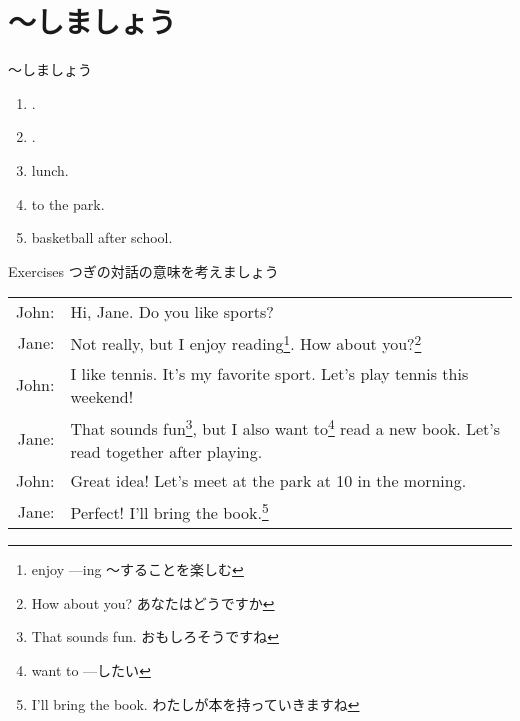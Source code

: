 \documentclass[aspectratio=169,xcolor={dvipsnames,table}]{beamer}
\begin{document}
\section{～しましょう}
\begin{frame}[plain]{～しましょう}
 \begin{enumerate}
  \item<1->  .
  \item<2->  .
  \item<3->   lunch. 
  \item<4->   to the park.
  \item<5->   basketball after school.
 \end{enumerate}

\hfill{}
\end{frame}
\begin{frame}[plain]{Exercises}
つぎの対話の意味を考えましょう\hfill{\scriptsize {}}


\begin{tabular}{rp{}}
John:& Hi, Jane. Do you like sports?\\
Jane:& Not really, but I enjoy reading\footnote{enjoy ---ing ～することを楽しむ}. How about you?\footnote{How about you? あなたはどうですか}\\
John:& I like tennis. It's my favorite sport. Let's play tennis this weekend!\\
Jane:& That sounds fun\footnote{That sounds fun. おもしろそうですね}, but I also want to\footnote{want to ---したい} read a new book. Let's read together after playing.\\
John:& Great idea! Let's meet at the park at 10 in the morning.\\
Jane:& Perfect! I'll bring the book.\footnote{I'll bring the book. わたしが本を持っていきますね}
\end{tabular}
\end{frame}
\end{document}
